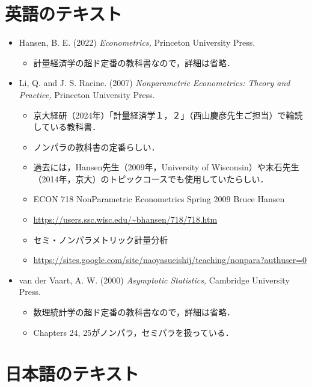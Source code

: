 \documentclass{jsarticle}
\begin{document}
\large

\section{英語のテキスト}

\begin{itemize}
  \item Hansen, B. E. (2022)
        \textit{Econometrics,} Princeton University Press.
        \begin{itemize}
          \item 計量経済学の超ド定番の教科書なので，詳細は省略．
        \end{itemize}
  
  \item Li, Q. and J. S. Racine. (2007)
        \textit{Nonparametric Econometrics: Theory and Practice,} 
        Princeton University Press.

        \begin{itemize}
        \item 京大経研（2024年）「計量経済学１，２」（西山慶彦先生ご担当）で輪読している教科書．
        \item ノンパラの教科書の定番らしい．
        \item 過去には，Hansen先生（2009年，University of Wisconsin）や末石先生（2014年，京大）のトピックコースでも使用していたらしい．
        \item ECON 718 NonParametric Econometrics Spring 2009 Bruce Hansen 
        \item \url{https://users.ssc.wisc.edu/~bhansen/718/718.htm}
        \item セミ・ノンパラメトリック計量分析 
        \item \url{https://sites.google.com/site/naoyasueishij/teaching/nonpara?authuser=0}
        \end{itemize}
  
  \item van der Vaart, A. W. (2000) 
  \textit{Asymptotic Statistics,} Cambridge University Press.
        \begin{itemize}
          \item 数理統計学の超ド定番の教科書なので，詳細は省略．
          \item Chapters 24, 25がノンパラ，セミパラを扱っている．
        \end{itemize}

\end{itemize}


\section{日本語のテキスト}
\end{document}
